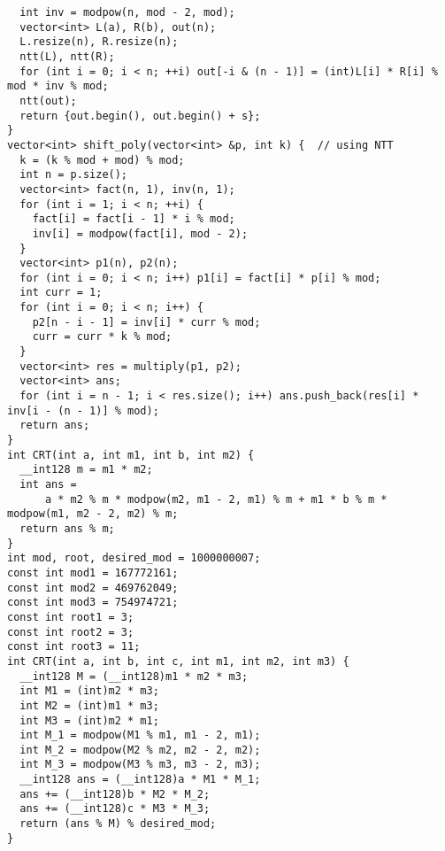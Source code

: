 \documentclass[twoside]{article}
\begin{document}
\begin{multicols*}{2}
\begin{verbatim}
  int inv = modpow(n, mod - 2, mod);
  vector<int> L(a), R(b), out(n);
  L.resize(n), R.resize(n);
  ntt(L), ntt(R);
  for (int i = 0; i < n; ++i) out[-i & (n - 1)] = (int)L[i] * R[i] % mod * inv % mod;
  ntt(out);
  return {out.begin(), out.begin() + s};
}
vector<int> shift_poly(vector<int> &p, int k) {  // using NTT
  k = (k % mod + mod) % mod;
  int n = p.size();
  vector<int> fact(n, 1), inv(n, 1);
  for (int i = 1; i < n; ++i) {
    fact[i] = fact[i - 1] * i % mod;
    inv[i] = modpow(fact[i], mod - 2);
  }
  vector<int> p1(n), p2(n);
  for (int i = 0; i < n; i++) p1[i] = fact[i] * p[i] % mod;
  int curr = 1;
  for (int i = 0; i < n; i++) {
    p2[n - i - 1] = inv[i] * curr % mod;
    curr = curr * k % mod;
  }
  vector<int> res = multiply(p1, p2);
  vector<int> ans;
  for (int i = n - 1; i < res.size(); i++) ans.push_back(res[i] * inv[i - (n - 1)] % mod);
  return ans;
}
int CRT(int a, int m1, int b, int m2) {
  __int128 m = m1 * m2;
  int ans =
      a * m2 % m * modpow(m2, m1 - 2, m1) % m + m1 * b % m * modpow(m1, m2 - 2, m2) % m;
  return ans % m;
}
int mod, root, desired_mod = 1000000007;
const int mod1 = 167772161;
const int mod2 = 469762049;
const int mod3 = 754974721;
const int root1 = 3;
const int root2 = 3;
const int root3 = 11;
int CRT(int a, int b, int c, int m1, int m2, int m3) {
  __int128 M = (__int128)m1 * m2 * m3;
  int M1 = (int)m2 * m3;
  int M2 = (int)m1 * m3;
  int M3 = (int)m2 * m1;
  int M_1 = modpow(M1 % m1, m1 - 2, m1);
  int M_2 = modpow(M2 % m2, m2 - 2, m2);
  int M_3 = modpow(M3 % m3, m3 - 2, m3);
  __int128 ans = (__int128)a * M1 * M_1;
  ans += (__int128)b * M2 * M_2;
  ans += (__int128)c * M3 * M_3;
  return (ans % M) % desired_mod;
}

\end{verbatim}

{
}
\end{multicols*}
\end{document}
